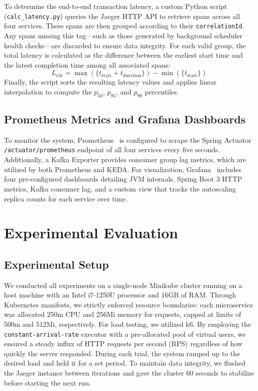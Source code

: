To determine the end-to-end transaction latency, a custom Python script 
(\texttt{calc\_latency.py}) queries the Jaeger HTTP API to retrieve spans 
across all four services.
%
These spans are then grouped according to their \texttt{correlationId}.
%
Any spans missing this tag---such as those generated by background scheduler 
health checks---are discarded to ensure data integrity.
%
For each valid group, the total latency is calculated as the difference between 
the earliest start time and the latest completion time among all associated spans:
%
\begin{equation}
  L_{\text{e2e}} = \max(\{t_{\text{start}} + t_{\text{duration}}\}) - \min(\{t_{\text{start}}\})
  \label{eq:latency}
\end{equation}
%
Finally, the script sorts the resulting latency values and applies linear 
interpolation to compute the $p_{50}$, $p_{95}$, and $p_{99}$ percentiles.

\subsection{Prometheus Metrics and Grafana Dashboards}
\label{subsec:prometheus}

To monitor the system, Prometheus~\cite{prometheus2015} is configured to scrape the Spring Actuator
\texttt{/actuator/prometheus} endpoint of all four services every five seconds.
%
Additionally, a Kafka Exporter provides consumer group lag metrics, which are
utilized by both Prometheus and KEDA.
%
For visualization, Grafana~\cite{grafana2024} includes four pre-configured dashboards detailing JVM
internals, Spring Boot 3 HTTP metrics, Kafka consumer lag, and a custom view
that tracks the autoscaling replica counts for each service over time.


\section{Experimental Evaluation}
\label{sec:evaluation}

\subsection{Experimental Setup}
\label{subsec:setup}
We conducted all experiments on a single-node Minikube cluster running on a 
host machine with an Intel i7-1250U processor and 16GB of RAM.
%
Through Kubernetes manifests, we strictly enforced resource boundaries: each 
microservice was allocated 250m CPU and 256Mi memory for requests, capped at 
limits of 500m and 512Mi, respectively.
%
For load testing, we utilized k6.
%
By employing the \texttt{constant-arrival-rate} executor with a pre-allocated 
pool of virtual users, we ensured a steady influx of HTTP requests per second (RPS) 
regardless of how quickly the server responded.
%
During each trial, the system ramped up to the desired load and held it for a set period.
%
To maintain data integrity, we flushed the Jaeger instance between iterations 
and gave the cluster 60 seconds to stabilize before starting the next run.

